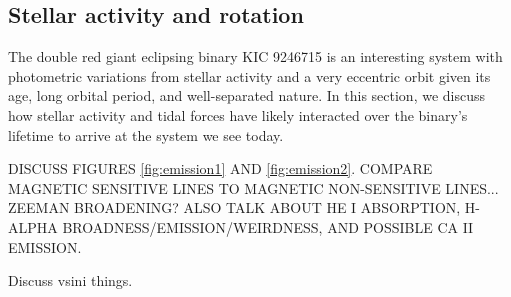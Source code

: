 \subsection{Stellar activity and rotation}\label{actrot}
The double red giant eclipsing binary KIC 9246715 is an interesting system with photometric variations from stellar activity and a very eccentric orbit given its age, long orbital period, and well-separated nature. In this section, we discuss how stellar activity and tidal forces have likely interacted over the binary's lifetime to arrive at the system we see today.

DISCUSS FIGURES \ref{fig:emission1} AND \ref{fig:emission2}. COMPARE MAGNETIC SENSITIVE LINES TO MAGNETIC NON-SENSITIVE LINES... ZEEMAN BROADENING? ALSO TALK ABOUT HE I ABSORPTION, H-ALPHA BROADNESS/EMISSION/WEIRDNESS, AND POSSIBLE CA II EMISSION. \citep{sis70,har73,fro12}

Discuss vsini things.
